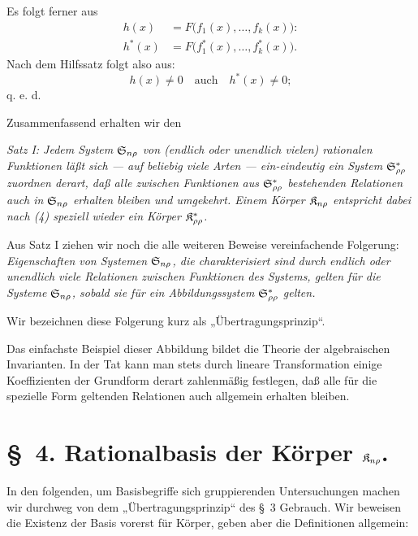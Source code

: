 Es folgt ferner aus
\begin{equation}
\begin{aligned}
 h(x)&=F\bigl(f_1(x),\ldots,f_k(x)\bigr):\\
 h^*(x)&=F\bigl(f_1^*(x),\ldots,f_k^*(x)\bigr).
\end{aligned}
\tag{4}
\end{equation}
Nach dem Hilfssatz folgt also aus:
\[
  h(x)\ne0\quad\text{auch}\quad h^*(x)\ne0;
\]
q. e. d.

Zusammenfassend erhalten wir den

\emph{Satz I: Jedem System $\mathfrak{S}_{n\rho}$ von (endlich oder unendlich vielen) rationalen Funktionen läßt sich --- auf beliebig viele Arten --- ein-eindeutig ein System $\mathfrak{S}^*_{\rho\rho}$ zuordnen derart, daß alle zwischen Funktionen aus $\mathfrak{S}^*_{\rho\rho}$ bestehenden Relationen auch in $\mathfrak{S}_{n\rho}$ erhalten bleiben und umgekehrt. Einem Körper $\mathfrak{K}_{n\rho}$ entspricht dabei nach (4) speziell wieder ein Körper $\mathfrak{K}^*_{\rho\rho}$.}

Aus Satz I ziehen wir noch die alle weiteren Beweise vereinfachende Folgerung: \emph{Eigenschaften von Systemen $\mathfrak{S}_{n\rho}$, die charakterisiert sind durch endlich oder unendlich viele Relationen zwischen Funktionen des Systems, gelten für die Systeme $\mathfrak{S}_{n\rho}$, sobald sie für ein Abbildungssystem $\mathfrak{S}^*_{\rho\rho}$ gelten.}

Wir bezeichnen diese Folgerung kurz als „Übertragungsprinzip“.



\providecommand{\Lsys}{\mathfrak{L}}
\providecommand{\Jdom}{\mathfrak{J}}

\clearpage
Das einfachste Beispiel dieser Abbildung bildet die Theorie der algebraischen Invarianten. In der Tat kann man stets durch lineare Transformation einige Koeffizienten der Grundform derart zahlenmäßig festlegen, daß alle für die spezielle Form geltenden Relationen auch allgemein erhalten bleiben.

\section*{\S\ 4. Rationalbasis der Körper $\mathfrak{K}_{n\rho}$.}

In den folgenden, um Basisbegriffe sich gruppierenden Untersuchungen machen wir durchweg von dem „Übertragungsprinzip“ des \S\ 3 Gebrauch. Wir beweisen die Existenz der Basis vorerst für Körper, geben aber die Definitionen allgemein:

